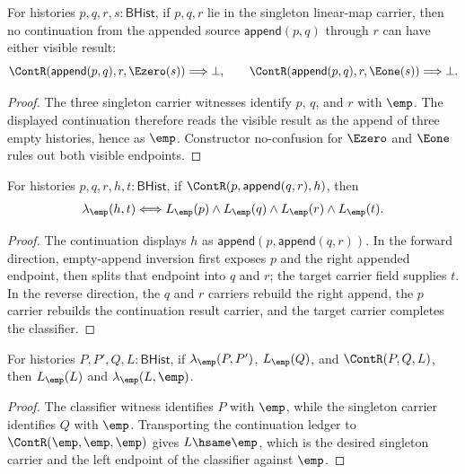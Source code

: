 

\begin{theorem}
\label{thm:linearmap-singleton-carrier-continuation-append-source-visible-result-absurd}
For histories $p,q,r,s:\mathsf{BHist}$, if $p,q,r$ lie in the singleton
linear-map carrier, then no continuation from the appended source
$\mathsf{append}(p,q)$ through $r$ can have either visible result:
$$
\ContR(\mathsf{append}(p,q),r,\Ezero(s))\Longrightarrow\bot,
\qquad
\ContR(\mathsf{append}(p,q),r,\Eone(s))\Longrightarrow\bot.
$$
\end{theorem}
\begin{proof}
The three singleton carrier witnesses identify $p$, $q$, and $r$ with
$\emp$. The displayed continuation therefore reads the visible result as the
append of three empty histories, hence as $\emp$. Constructor no-confusion for
$\Ezero$ and $\Eone$ rules out both visible endpoints.
\end{proof}

\begin{theorem}
\label{thm:linearmap-singleton-classifier-continuation-append-target-classifier}
For histories $p,q,r,h,t:\mathsf{BHist}$, if
$\ContR(p,\mathsf{append}(q,r),h)$, then
$$
\lambda_{\emp}(h,t)
\Longleftrightarrow
L_{\emp}(p)\wedge L_{\emp}(q)\wedge L_{\emp}(r)\wedge L_{\emp}(t).
$$
\end{theorem}
\begin{proof}
The continuation displays $h$ as $\mathsf{append}(p,\mathsf{append}(q,r))$.
In the forward direction, empty-append inversion first exposes $p$ and the
right appended endpoint, then splits that endpoint into $q$ and $r$; the target
carrier field supplies $t$. In the reverse direction, the $q$ and $r$ carriers
rebuild the right append, the $p$ carrier rebuilds the continuation result
carrier, and the target carrier completes the classifier.
\end{proof}

\begin{theorem}
\label{thm:linearmap-singleton-classifier-continuation-left-closed}
For histories $P,P',Q,L:\mathsf{BHist}$, if $\lambda_{\emp}(P,P')$,
$L_{\emp}(Q)$, and $\ContR(P,Q,L)$, then $L_{\emp}(L)$ and
$\lambda_{\emp}(L,\emp)$.
\end{theorem}
\begin{proof}
The classifier witness identifies $P$ with $\emp$, while the singleton carrier
identifies $Q$ with $\emp$. Transporting the continuation ledger to
$\ContR(\emp,\emp,\emp)$ gives $L\hsame\emp$, which is the desired singleton
carrier and the left endpoint of the classifier against $\emp$.
\end{proof}

